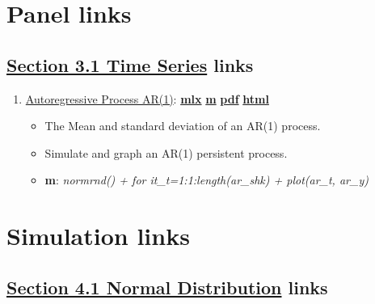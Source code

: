 \documentclass[
]{book}
\providecommand{\tightlist}{%
  \setlength{\itemsep}{0pt}\setlength{\parskip}{0pt}}
\begin{document}
\hypertarget{panel-links}{%
\section{Panel links}\label{panel-links}}

\hypertarget{section-3.1-time-seriestime-series-links}{%
\subsection{\texorpdfstring{\protect\hyperlink{time-series}{Section 3.1 Time Series} links}{Section 3.1 Time Series links}}\label{section-3.1-time-seriestime-series-links}}

\begin{enumerate}
\def\labelenumi{\arabic{enumi}.}
\tightlist
\item
  \href{https://fanwangecon.github.io/M4Econ/panel/timeseries/htmlpdfm/fs_autoregressive.html}{Autoregressive Process AR(1)}: \href{https://github.com/FanWangEcon/M4Econ/blob/master/panel/timeseries/fs_autoregressive.mlx}{\textbf{mlx}} \textbar{} \href{https://github.com/FanWangEcon/M4Econ/blob/master/panel/timeseries/htmlpdfm/fs_autoregressive.m}{\textbf{m}} \textbar{} \href{https://github.com/FanWangEcon/M4Econ/blob/master/panel/timeseries/htmlpdfm/fs_autoregressive.pdf}{\textbf{pdf}} \textbar{} \href{https://fanwangecon.github.io/M4Econ/panel/timeseries/htmlpdfm/fs_autoregressive.html}{\textbf{html}}

  \begin{itemize}
  \tightlist
  \item
    The Mean and standard deviation of an AR(1) process.
  \item
    Simulate and graph an AR(1) persistent process.
  \item
    \textbf{m}: \emph{normrnd() + for it\_t=1:1:length(ar\_shk) + plot(ar\_t, ar\_y)}
  \end{itemize}
\end{enumerate}

\hypertarget{simulation-links}{%
\section{Simulation links}\label{simulation-links}}

\hypertarget{section-4.1-normal-distributionnormal-distribution-links}{%
\subsection{\texorpdfstring{\protect\hyperlink{normal-distribution}{Section 4.1 Normal Distribution} links}{Section 4.1 Normal Distribution links}}\label{section-4.1-normal-distributionnormal-distribution-links}}
\end{document}
